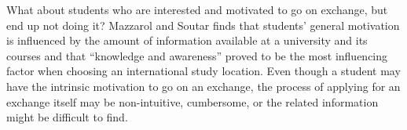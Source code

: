 What about students who are interested and motivated to go on exchange, but end up not doing it? Mazzarol and Soutar \cite{mazzarol2002push} finds that students' general motivation is influenced by the amount of information available at a university and its courses and that \enquote{knowledge and awareness} proved to be the most influencing factor when choosing an international study location. Even though a student may have the intrinsic motivation to go on an exchange, the process of applying for an exchange itself may be non-intuitive, cumbersome, or the related information might be difficult to find. 
\fi

\cleardoublepage
